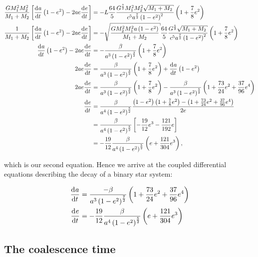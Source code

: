 \begin{align}
    \frac{GM_1^2M_2^2}{M_1+M_2}\bqty{\dv{a}{t}\pqty{1-e^2}-2ae\dv{e}{t}} &= -L\frac{64}{5}\frac{G^\frac72 M_1^2M_2^2\sqrt{M_1+M_2}}{c^5 a^\frac72 \pqty{1-e^2}^2}\pqty{1+\frac78 e^2} \notag\\
    \frac{1}{M_1+M_2}\bqty{\dv{a}{t}\pqty{1-e^2}-2ae\dv{e}{t}} &= -\sqrt{\frac{GM_2^2M_1^2a\pqty{1-e^2}}{M_1+M_2}}\frac{64}{5}\frac{G^\frac52 \sqrt{M_1+M_2}}{c^5 a^\frac72 \pqty{1-e^2}^2}\pqty{1+\frac78 e^2} \notag\\
    \dv{a}{t}\pqty{1-e^2}-2ae\dv{e}{t} &= -\frac{\beta}{a^3 \pqty{1-e^2}^\frac32}\pqty{1+\frac78 e^2} \notag\\
    2ae\dv{e}{t} &= \frac{\beta}{a^3 \pqty{1-e^2}^\frac32}\pqty{1+\frac78 e^2}+\dv{a}{t}\pqty{1-e^2} \notag\\
    2ae\dv{e}{t} &= \frac{\beta}{a^3 \pqty{1-e^2}^\frac32}\pqty{1+\frac78 e^2}-\frac{\beta}{a^3\pqty{1-e^2}^\frac52}\pqty{1+\frac{73}{24}e^2+\frac{37}{96}e^4} \notag\\
    \dv{e}{t} &= \frac{\beta}{a^4 \pqty{1-e^2}^\frac52}\frac{\pqty{1-e^2}\pqty{1+\frac78 e^2}-\pqty{1+\frac{73}{24}e^2+\frac{37}{96}e^4}}{2e} \notag\\
    &= \frac{\beta}{a^4 \pqty{1-e^2}^\frac52}\bqty{-\frac{19}{12}e^3-\frac{121}{192} e} \notag\\
    &= -\frac{19}{12}\frac{\beta}{a^4 \pqty{1-e^2}^\frac52}\pqty{e+\frac{121}{304}e^3},
\end{align}

which is our second equation. Hence we arrive at the coupled differential equations describing the decay of a binary star system:

\begin{tcolorbox}[enhanced,title={\hypersetup{citecolor=white}\citet{Peters:1964} equations for the inspiral of two compact objects}]
    \begin{subequations}
        \begin{align}
            \dv{a}{t} &= \frac{-\beta}{a^3\pqty{1-e^2}^\frac72}\pqty{1+\frac{73}{24}e^2+\frac{37}{96}e^4}\label{eq:peters_sma} \\
            \dv{e}{t} &= -\frac{19}{12}\frac{\beta}{a^4\pqty{1-e^2}^\frac52}\pqty{e+\frac{121}{304}e^3}\label{eq:peters_ecc}
        \end{align}
        \label{eq:peters_coupled_equations}
    \end{subequations}
\end{tcolorbox}

\subsection{The coalescence time}


